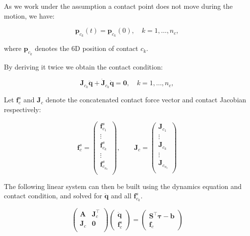 As we work under the assumption a contact point does not move during
the motion, we have:

\begin{equation}
\mathbf{p}_{c_k}(t)=\mathbf{p}_{c_k}(0),\quad k = 1,\ldots,n_c,
\end{equation}

where $\mathbf{p}_{c_k}$ denotes the 6D position of contact $c_k$.

By deriving it twice we obtain the contact condition:

\begin{equation}
\mathbf{J}_{c_k}\ddot{\mathbf{q}} +
\dot{\mathbf{J}}_{c_k}\dot{\mathbf{q}}=\mathbf{0}, \quad k = 1,\ldots,n_c,
\end{equation}

Let $\mathbf{f}^s_c$ and $\mathbf{J}_c$ denote the concatenated
contact force vector and contact Jacobian respectively:

\begin{equation}
\mathbf{f}^s_c=
\left(\begin{matrix}
\mathbf{f}^s_{c_1}\\
\vdots\\
\mathbf{f}^s_{c_k}\\
\vdots\\
\mathbf{f}^s_{c_{n_c}}\\
\end{matrix}\right),
\qquad
\mathbf{J}_c=
\left(\begin{matrix}
\mathbf{J}_{c_1}\\
\vdots\\
\mathbf{J}_{c_k}\\
\vdots\\
\mathbf{J}_{c_{n_c}}\\
\end{matrix}\right)
\end{equation}

The following linear system can then be built using the dynamics
equation and contact condition, and solved for $\ddot{\mathbf{q}}$ and
all $\mathbf{f}^s_{c_k}$.

\begin{equation}
  \left(\begin{matrix}
    \mathbf{A} & \mathbf{J}_{c}^\top \\
    \mathbf{J}_{c} & \mathbf{0}\\
  \end{matrix}\right)
  \left(\begin{matrix}
  \ddot{\mathbf{q}}\\
  \mathbf{f}^s_{c}
  \end{matrix}\right)
  = \left(\begin{matrix} \mathbf{S}^\top\boldsymbol{\tau}-\mathbf{b}
    \\ \mathbf{f}_{c}
  \end{matrix}\right)
\end{equation}

